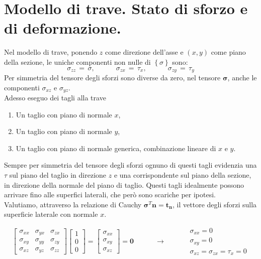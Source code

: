 \section{Modello di trave. Stato di sforzo e di deformazione.}

Nel modello di trave, ponendo $z$ come direzione dell'asse e $(x,y)$ come piano della sezione, le uniche componenti non nulle di $\left\{\sigma\right\}$ sono:
\begin{equation*}
    \sigma_{zz}\, =\, \sigma, \quad\quad\quad  \sigma_{zx}\, =\, \tau_x, \quad\quad\quad \sigma_{zy}\, =\, \tau_y 
\end{equation*}
Per simmetria del tensore degli sforzi sono diverse da zero, nel tensore $\boldsymbol{\sigma}$, anche le componenti $\sigma_{xz}$ e $\sigma_{yz}$.\\
Adesso eseguo dei tagli alla trave
\begin{enumerate}
    \item Un taglio con piano di normale $x$,\\
    \item Un taglio con piano di normale $y$,\\
    \item Un taglio con piano di normale generica, combinazione lineare di $x$ e $y$.
\end{enumerate}
Sempre per simmetria del tensore degli sforzi ognuno di questi tagli evidenzia una $\tau$ sul piano del taglio in direzione $z$ e una corrispondente sul piano della sezione, in direzione della normale del piano di taglio. Questi tagli idealmente possono arrivare fino alle superfici laterali, che però sono scariche per ipotesi.\\
Valutiamo, attraverso la relazione di Cauchy $\boldsymbol{\sigma}^T\mathbf{n}=\mathbf{t_n}$, il vettore degli sforzi sulla superficie laterale con normale $x$.
 
\begin{equation*}
\begin{bmatrix}
\sigma_{xx} & \sigma_{yx} & \sigma_{zx} \\
\sigma_{xy} & \sigma_{yy} & \sigma_{zy} \\
\sigma_{xz} & \sigma_{yz} & \sigma_{zz}
\end{bmatrix}
\begin{bmatrix}
1 \\
0 \\
0
\end{bmatrix}
=
\begin{bmatrix}
\sigma_{xx} \\
\sigma_{xy} \\
\sigma_{xz}
\end{bmatrix}
= \mathbf{0}   
\quad\quad\quad \rightarrow \quad\quad\quad 
\begin{matrix}
\sigma_{xx} = 0 \\
\sigma_{xy} = 0 \\
\sigma_{xz} = \sigma_{zx}  = \tau_x = 0
\end{matrix}
\end{equation*}

